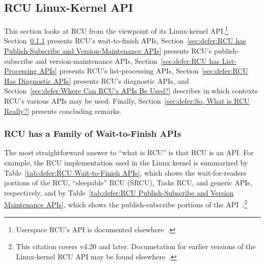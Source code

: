 
\subsection{RCU Linux-Kernel API}
\label{sec:defer:RCU Linux-Kernel API}

This section looks at RCU from the viewpoint of its Linux-kernel API.\footnote{
	Userspace RCU's API is documented
	elsewhere~\cite{PaulMcKenney2013LWNURCU}.}
Section~\ref{sec:defer:RCU has a Family of Wait-to-Finish APIs}
presents RCU's wait-to-finish APIs,
Section~\ref{sec:defer:RCU has Publish-Subscribe and Version-Maintenance APIs}
presents RCU's publish-subscribe and version-maintenance APIs,
Section~\ref{sec:defer:RCU has List-Processing APIs}
presents RCU's list-processing APIs,
Section~\ref{sec:defer:RCU Has Diagnostic APIs}
presents RCU's diagnostic APIs, and
Section~\ref{sec:defer:Where Can RCU's APIs Be Used?}
describes in which contexts RCU's various APIs may be used.
Finally,
Section~\ref{sec:defer:So, What is RCU Really?}
presents concluding remarks.

\subsubsection{RCU has a Family of Wait-to-Finish APIs}
\label{sec:defer:RCU has a Family of Wait-to-Finish APIs}

The most straightforward answer to ``what is RCU'' is that RCU is
an API.
For example, the RCU implementation used in the Linux kernel is
summarized by
Table~\ref{tab:defer:RCU Wait-to-Finish APIs},
which shows the wait-for-readers portions of the RCU, ``sleepable'' RCU
(SRCU), Tasks RCU, and generic APIs, respectively,
and by
Table~\ref{tab:defer:RCU Publish-Subscribe and Version Maintenance APIs},
which shows the publish-subscribe portions of the
API~\cite{PaulEMcKenney2019RCUAPI}.\footnote{
	This citation covers v4.20 and later.
	Documetation for earlier versions of the Linux-kernel RCU API may
	be found elsewhere~\cite{PaulEMcKenney2008WhatIsRCUAPI,PaulEMcKenney2014RCUAPI}.}


